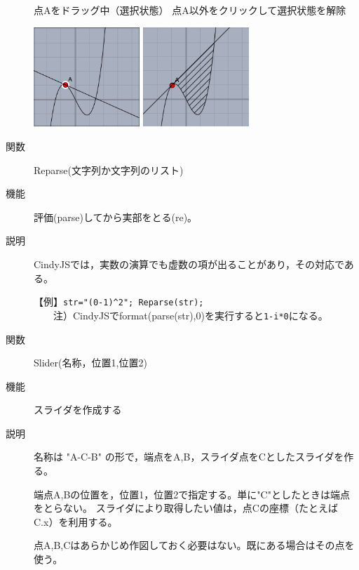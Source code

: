 \documentclass[papersize,a4paper,12pt,uplatex]{jsarticle}
\begin{document}
\begin{description}
\vspace{\baselineskip}
\hspace{5mm} 点Aをドラッグ中（選択状態）\hspace{5mm} 点A以外をクリックして選択状態を解除

\hspace{10mm}\includegraphics[bb=0.00 0.00 218.01 204.51,width=40mm]{Fig/ptselected01.pdf} 
\hspace{10mm}\includegraphics[bb=0.00 0.00 219.01 204.51,width=40mm]{Fig/ptselected02.pdf} 

\vspace{\baselineskip}
\hypertarget{reparse}{}
\item[関数]Reparse(文字列か文字列のリスト)
\item[機能]評価(parse)してから実部をとる(re)。
\item[説明]CindyJSでは，実数の演算でも虚数の項が出ることがあり，その対応である。

【例】\verb|str="(0-1)^2"; Reparse(str);|\\
　　注）CindyJSでformat(parse(str),0)を実行すると\verb|1-i*0|になる。

\vspace{\baselineskip}
\hypertarget{slider}{}
\item[関数]Slider(名称，位置1,位置2)
\item[機能]スライダを作成する
\item[説明]名称は "A-C-B" の形で，端点をA,B，スライダ点をCとしたスライダを作る。

端点A,Bの位置を，位置1，位置2で指定する。単に"C"としたときは端点をとらない。
スライダにより取得したい値は，点Cの座標（たとえば C.x）を利用する。

点A,B,Cはあらかじめ作図しておく必要はない。既にある場合はその点を使う。


\end{description}
\end{document}
